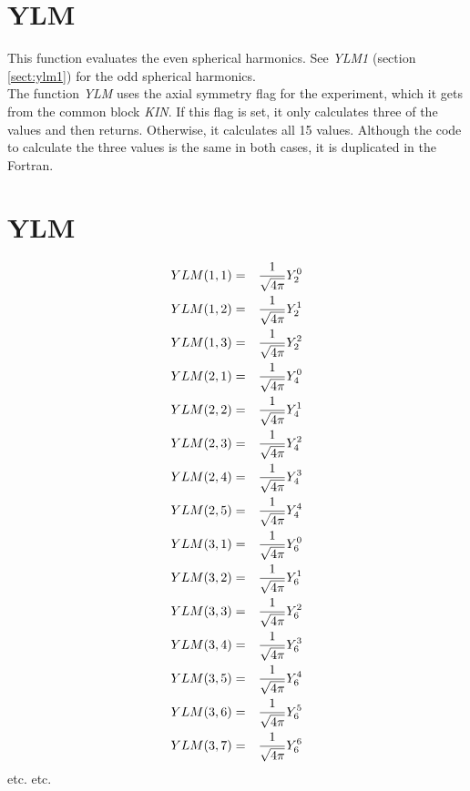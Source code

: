 \section{YLM}
\label{sect:ylm}

\noindent This function evaluates the even spherical harmonics. See {\em
YLM1} (section \ref{sect:ylm1}) for the odd spherical harmonics.\\

\noindent The function {\em YLM} uses the axial symmetry flag for the
experiment, which it gets from the common block {\em KIN}. If this flag is
set, it only calculates three of the values and then returns. Otherwise, it
calculates all 15 values. Although the code to calculate the three values is
the same in both cases, it is duplicated in the Fortran.\\

\section{YLM}
\begin{eqnarray}
YLM(1,1)&=&{1 \over \sqrt{4 \pi}} Y_2^0\nonumber\\
YLM(1,2)&=&{1 \over \sqrt{4 \pi}} Y_2^1\nonumber\\
YLM(1,3)&=&{1 \over \sqrt{4 \pi}} Y_2^2\nonumber\\
YLM(2,1)&=&{1 \over \sqrt{4 \pi}} Y_4^0\nonumber\\
YLM(2,2)&=&{1 \over \sqrt{4 \pi}} Y_4^1\nonumber\\
YLM(2,3)&=&{1 \over \sqrt{4 \pi}} Y_4^2\nonumber\\
YLM(2,4)&=&{1 \over \sqrt{4 \pi}} Y_4^3\nonumber\\
YLM(2,5)&=&{1 \over \sqrt{4 \pi}} Y_4^4\nonumber\\
YLM(3,1)&=&{1 \over \sqrt{4 \pi}} Y_6^0\nonumber\\
YLM(3,2)&=&{1 \over \sqrt{4 \pi}} Y_6^1\nonumber\\
YLM(3,3)&=&{1 \over \sqrt{4 \pi}} Y_6^2\nonumber\\
YLM(3,4)&=&{1 \over \sqrt{4 \pi}} Y_6^3\nonumber\\
YLM(3,5)&=&{1 \over \sqrt{4 \pi}} Y_6^4\nonumber\\
YLM(3,6)&=&{1 \over \sqrt{4 \pi}} Y_6^5\nonumber\\
YLM(3,7)&=&{1 \over \sqrt{4 \pi}} Y_6^6\nonumber\\
\end{eqnarray}
etc. etc.\\

